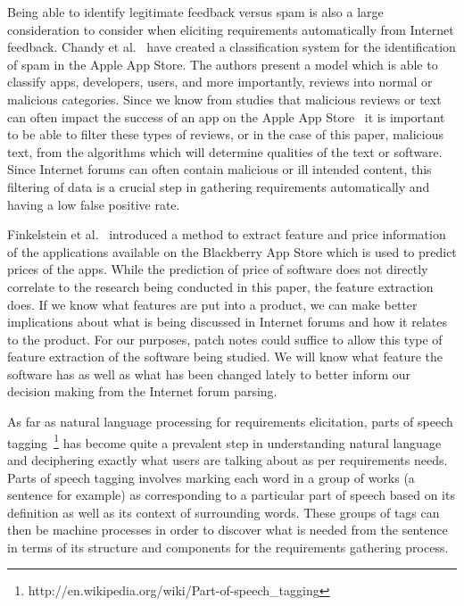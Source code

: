 \documentclass[conference]{IEEEtran}
\begin{document}
Being able to identify legitimate feedback versus spam is also a large consideration to consider
when eliciting requirements automatically from Internet feedback. Chandy et al.~\cite{Chandy:2012:ISI}
have created a classification system for the identification of spam in the Apple App Store. The authors
present a model which is able to classify apps, developers, users, and more importantly, reviews into
normal or malicious categories. Since we know from studies that malicious reviews or text can often
impact the success of an app on the Apple App Store~\cite{Pagano:2013:FAS} it is important to be
able to filter these types of reviews, or in the case of this paper, malicious text, from the algorithms
which will determine qualities of the text or software. Since Internet forums can often contain
malicious or ill intended content, this filtering of data is a crucial step in gathering requirements
automatically and having a low false positive rate.

Finkelstein et al.~\cite{Finkelstein:2013:MAS} introduced a method to extract feature
and price information of the applications available on the Blackberry App Store which
is used to predict prices of the apps. While the prediction of price of software does not directly
correlate to the research being conducted in this paper, the feature extraction does. If we know
what features are put into a product, we can make better implications about what is being
discussed in Internet forums and how it relates to the product. For our purposes, patch notes
could suffice to allow this type of feature extraction of the software being studied. We will
know what feature the software has as well as what has been changed lately to better inform
our decision making from the Internet forum parsing.

As far as natural language processing for requirements elicitation, 
parts of speech tagging~\footnote{http://en.wikipedia.org/wiki/Part-of-speech\_tagging} has
become quite a prevalent step in understanding natural language and deciphering exactly
what users are talking about as per requirements needs. Parts of speech tagging involves marking 
each word in a group of works (a sentence for example) as corresponding to a particular part of speech
based on its definition as well as its context of surrounding words. These groups of tags can then be
machine processes in order to discover what is needed from the sentence in terms of its structure
and components for the requirements gathering process.
\end{document}
